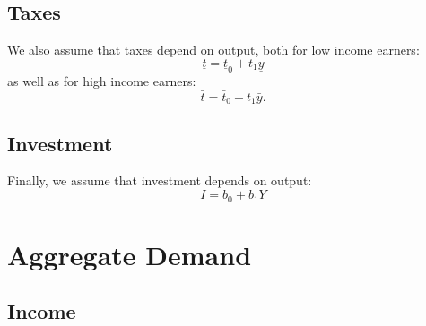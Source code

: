 \documentclass[]{book}
\begin{document}
\subsection{Taxes}\label{taxes}

We also assume that taxes depend on output, both for low income earners:
\[\underline{t}=\underline{t}_{0}+t_1\underline{y}\] as well as for high
income earners: \[\bar{t}=\bar{t}_{0}+t_1\bar{y}.\]

\subsection{Investment}\label{investment}

Finally, we assume that investment depends on output: \[I=b_{0}+b_{1}Y\]

\section{Aggregate Demand}\label{aggregate-demand}

\subsection{Income}\label{income}
\end{document}

